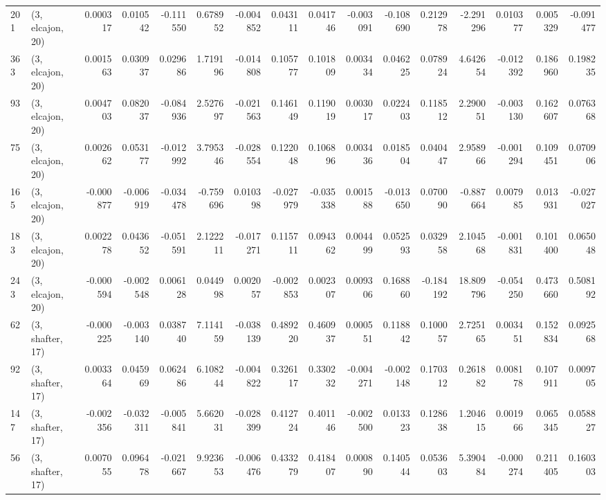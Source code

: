 \begin{tabular}{llrrrrrrrrrrrrrr}
201 &  (3, elcajon, 20) &   0.000317 &  0.010542 & -0.111550 &   0.678952 & -0.004852 &   0.043111 &  0.041746 & -0.003091 & -0.108690 &  0.212978 &    -2.291296 &   0.010377 &   0.005329 &  -0.091477 \\
363 &  (3, elcajon, 20) &   0.001563 &  0.030937 &  0.029686 &   1.719196 & -0.014808 &   0.105777 &  0.101809 &  0.003434 &  0.046225 &  0.078924 &     4.642654 &  -0.012392 &   0.186960 &   0.198235 \\
93  &  (3, elcajon, 20) &   0.004703 &  0.082037 & -0.084936 &   2.527697 & -0.021563 &   0.146149 &  0.119019 &  0.003017 &  0.022403 &  0.118512 &     2.290051 &  -0.003130 &   0.162607 &   0.076368 \\
75  &  (3, elcajon, 20) &   0.002662 &  0.053177 & -0.012992 &   3.795346 & -0.028554 &   0.122048 &  0.106896 &  0.003436 &  0.018504 &  0.040447 &     2.958966 &  -0.001294 &   0.109451 &   0.070906 \\
165 &  (3, elcajon, 20) &  -0.000877 & -0.006919 & -0.034478 &  -0.759696 &  0.010398 &  -0.027979 & -0.035338 &  0.001588 & -0.013650 &  0.070090 &    -0.887664 &   0.007985 &   0.013931 &  -0.027027 \\
183 &  (3, elcajon, 20) &   0.002278 &  0.043652 & -0.051591 &   2.122211 & -0.017271 &   0.115711 &  0.094362 &  0.004499 &  0.052593 &  0.032958 &     2.104568 &  -0.001831 &   0.101400 &   0.065048 \\
243 &  (3, elcajon, 20) &  -0.000594 & -0.002548 &  0.006128 &   0.044998 &  0.002057 &  -0.002853 &  0.002307 &  0.009306 &  0.168860 & -0.184192 &    18.809796 &  -0.054250 &   0.473660 &   0.508192 \\
62  &  (3, shafter, 17) &  -0.000225 & -0.003140 &  0.038740 &   7.114159 & -0.038139 &   0.489220 &  0.460937 &  0.000551 &  0.118842 &  0.100057 &     2.725165 &   0.003451 &   0.152834 &   0.092568 \\
92  &  (3, shafter, 17) &   0.003364 &  0.045969 &  0.062486 &   6.108244 & -0.004822 &   0.326117 &  0.330232 & -0.004271 & -0.002148 &  0.170312 &     0.261882 &   0.008178 &   0.107911 &   0.009705 \\
147 &  (3, shafter, 17) &  -0.002356 & -0.032311 & -0.005841 &   5.662031 & -0.028399 &   0.412724 &  0.401146 & -0.002500 &  0.013323 &  0.128638 &     1.204615 &   0.001966 &   0.065345 &   0.058827 \\
56  &  (3, shafter, 17) &   0.007055 &  0.096478 & -0.021667 &   9.923653 & -0.006476 &   0.433279 &  0.418407 &  0.000890 &  0.140544 &  0.053603 &     5.390484 &  -0.000274 &   0.211405 &   0.160303 \\

\end{tabular}
